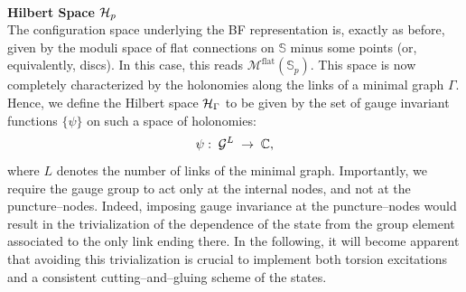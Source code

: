 \documentclass[nofootinbib,superscriptaddress,eqsecnum,tightenlines,11pt]{revtex4-1}
\def\be{\begin{equation}}
\def\ee{\end{equation}}
\renewcommand{\S}{{\mathbb S}}
\newcommand{\cred}{\color{red}}
\begin{document}
~\\
{\bf {Hilbert Space ${\cal H}_p$}}\\
The configuration space underlying the BF representation is, exactly as before, given by the moduli space of flat connections on $\S$ minus some points (or, equivalently, discs).
In this case, this reads $\mathcal M^\text{flat}(\S_p)$.
This space is now completely characterized by the holonomies along the links of a minimal graph $\Gamma$.
Hence, we define the Hilbert space ${\cal H}_\Gamma$ to be given by the set of gauge invariant functions $\{\psi\}$ on such a space of holonomies:
\be
\psi:\; {\cal G}^L \; \to \; \mathbb{C},
\ee
where $L$ denotes the number of links of the minimal graph. Importantly, we require the gauge group to act only at the internal nodes, and not at the puncture--nodes.  Indeed, imposing gauge invariance at the puncture--nodes would result in the trivialization of the dependence of the state from  the group element associated to the only link ending there. In the following, it will become apparent that avoiding this trivialization is crucial to implement both torsion excitations and a consistent cutting--and--gluing scheme of the states. %
\end{document}
